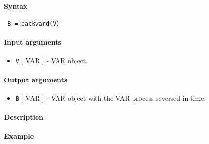 


	\paragraph{Syntax}
 
 \begin{verbatim}
 B = backward(V)
 \end{verbatim}
 
 \paragraph{Input arguments}
 
 \begin{itemize}
 \item
   \texttt{V} {[} VAR {]} - VAR object.
 \end{itemize}
 
 \paragraph{Output arguments}
 
 \begin{itemize}
 \item
   \texttt{B} {[} VAR {]} - VAR object with the VAR process reversed in
   time.
 \end{itemize}
 
 \paragraph{Description}
 
 \paragraph{Example}


